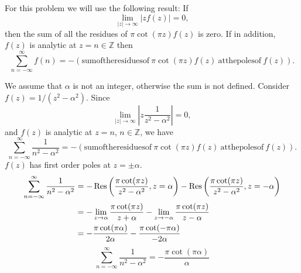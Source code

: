 {%
\begin{Solution}
  \label{solution sum 1/(n^2-a^2)}
  For this problem we will use the following result:
  If
  \[
  \lim_{|z| \to \infty} \left| z f(z) \right| = 0,
  \]
  then the sum of all the residues of $\pi \cot(\pi z) f(z)$ is zero.  If
  in addition, $f(z)$ is analytic at $z = n \in \mathbb{Z}$ then
  \[
  \sum_{n = -\infty}^\infty f(n) = -( \mathrm{sum of the residues of}\ 
    \pi \cot(\pi z) f(z)\ \mathrm{at the poles of}\ f(z) ).
  \]

  We assume that $\alpha$ is not an integer, otherwise the sum is not 
  defined.  Consider $f(z) = 1/(z^2 - \alpha^2)$.  Since
  \[
  \lim_{|z| \to \infty} \left| z \frac{ 1 }{ z^2 - \alpha^2 } \right| = 0,
  \]
  and $f(z)$ is analytic at $z = n$, $n \in \mathbb{Z}$, we have
  \[
  \sum_{n = -\infty}^\infty \frac{1}{n^2 - \alpha^2} = 
  -( \mathrm{sum of the residues of}\ 
    \pi \cot(\pi z) f(z)\ \mathrm{at the poles of}\ f(z) ).
  \]
  $f(z)$ has first order poles at $z = \pm \alpha$.
  \begin{align*}
    \sum_{n = -\infty}^\infty \frac{1}{n^2 - \alpha^2}
    &= - \mathop{\mathrm{Res}}\nolimits \left( \frac{ \pi \cot(\pi z) }{ z^2 - \alpha^2 },
      z = \alpha \right)
    - \mathop{\mathrm{Res}}\nolimits \left( \frac{ \pi \cot(\pi z) }{ z^2 - \alpha^2 },
      z = -\alpha \right) \\
    &= - \lim_{z \to \alpha} \frac{ \pi \cot(\pi z) }{ z + \alpha }
    - \lim_{z \to -\alpha} \frac{ \pi \cot(\pi z) }{ z - \alpha }\\
    &= - \frac{ \pi \cot(\pi \alpha) }{ 2 \alpha }
    - \frac{ \pi \cot(- \pi \alpha) }{ - 2 \alpha }
  \end{align*}
  \[
  \boxed{
    \sum_{n = -\infty}^\infty \frac{1}{n^2 - \alpha^2}
    = - \frac{ \pi \cot(\pi \alpha) }{ \alpha }
    }
  \]
\end{Solution}













\raggedbottom

}
